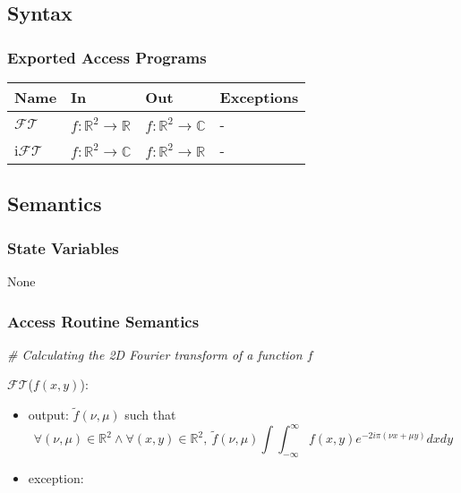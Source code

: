 \documentclass[12pt, titlepage]{article}
\begin{document}
\subsection{Syntax}

\subsubsection{Exported Access Programs}

\begin{center}
\begin{tabular}{p{2cm} p{4cm} p{4cm} p{2cm}}
\hline
\textbf{Name} & \textbf{In} & \textbf{Out} & \textbf{Exceptions} \\
\hline
$\mathcal{FT}$ & $f:\mathbb{R}^2\rightarrow\mathbb{R}$ & $f:\mathbb{R}^2\rightarrow\mathbb{C}$ & - \\
i$\mathcal{FT}$ & $f:\mathbb{R}^2\rightarrow\mathbb{C}$ & $f:\mathbb{R}^2\rightarrow\mathbb{R}$ & - \\
\hline
\end{tabular}
\end{center}

\subsection{Semantics}

\subsubsection{State Variables}
None

\subsubsection{Access Routine Semantics}

\noindent\textit{{\#} Calculating the 2D Fourier transform of a function $f$} \medskip

\noindent $\mathcal{FT}$($f(x,y)$):
\begin{itemize} 
\item output: $\widetilde{f}(\nu,\mu)$ such that 
\begin{equation*}
\forall (\nu,\mu) \in \mathbb{R}^2 \wedge \forall (x,y) \in \mathbb{R}^2, \ \widetilde{f}(\nu,\mu)\int\int_{-\infty}^{\infty}f(x,y)e^{-2i\pi(\nu x+\mu y)}dxdy
\end{equation*}
\item exception:  
\end{itemize}
\end{document}
